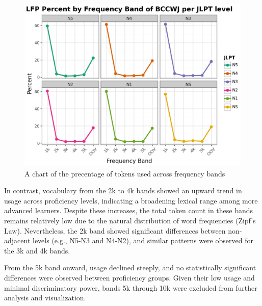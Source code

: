 \begin{figure}[htbp]
    \centering
    \includegraphics[scale=.4]{img/LFP/percentBands}
    \caption[A chart of the distribution of the average percent of tokens used across frequency band]{A chart of the precentage of tokens used across frequency bands}
    \label{fig:percentBands}
\end{figure}

In contrast, vocabulary from the 2k to 4k bands showed an upward trend in usage across proficiency levels,
indicating a broadening lexical range among more advanced learners. Despite these increases, the total token count
in these bands remains relatively low due to the natural distribution of word frequencies (Zipf's Law).
Nevertheless, the 2k band showed significant differences between non-adjacent levels (e.g., N5-N3 and N4-N2), and
similar patterns were observed for the 3k and 4k bands.

From the 5k band onward, usage declined steeply, and no statistically
significant differences were observed between proficiency groups. Given their low usage and minimal discriminatory
power, bands
5k through 10k were excluded from further analysis and visualization.


